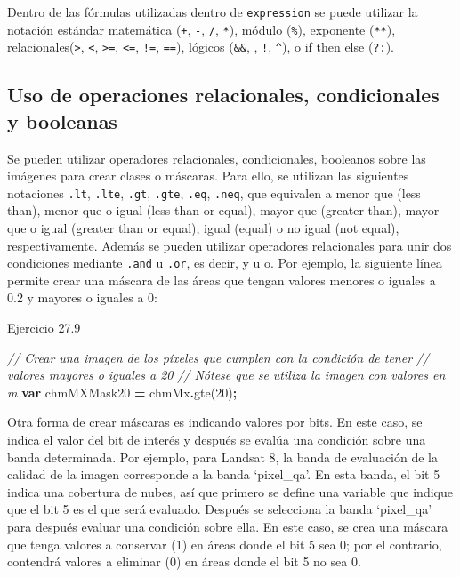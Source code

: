\documentclass[
  12pt,
  letterpaper,
  twoside]{book}
\newenvironment{Shaded}{\begin{snugshade}}{\end{snugshade}}
\newcommand{\CommentTok}[1]{\textcolor[rgb]{0.56,0.35,0.01}{\textit{#1}}}
\newcommand{\DecValTok}[1]{\textcolor[rgb]{0.00,0.00,0.81}{#1}}
\newcommand{\FunctionTok}[1]{\textcolor[rgb]{0.00,0.00,0.00}{#1}}
\newcommand{\KeywordTok}[1]{\textcolor[rgb]{0.13,0.29,0.53}{\textbf{#1}}}
\newcommand{\NormalTok}[1]{#1}
\newcommand{\OperatorTok}[1]{\textcolor[rgb]{0.81,0.36,0.00}{\textbf{#1}}}
\begin{document}
Dentro de las fórmulas utilizadas dentro de \texttt{expression} se puede utilizar la notación estándar matemática (\texttt{+}, \texttt{-}, \texttt{/}, \texttt{*}), módulo (\texttt{\%}), exponente (\texttt{**}), relacionales(\texttt{\textgreater{}}, \texttt{\textless{}}, \texttt{\textgreater{}=}, \texttt{\textless{}=}, \texttt{!=}, \texttt{==}), lógicos (\texttt{\&\&}, \texttt{\textbar{}\textbar{}}, \texttt{!}, \texttt{\^{}}), o if then else (\texttt{?:}).

\hypertarget{uso-de-operaciones-relacionales-condicionales-y-booleanas}{%
\subsection{Uso de operaciones relacionales, condicionales y booleanas}\label{uso-de-operaciones-relacionales-condicionales-y-booleanas}}

Se pueden utilizar operadores relacionales, condicionales, booleanos sobre las imágenes para crear clases o máscaras. Para ello, se utilizan las siguientes notaciones \texttt{.lt}, \texttt{.lte}, \texttt{.gt}, \texttt{.gte}, \texttt{.eq}, \texttt{.neq}, que equivalen a menor que (less than), menor que o igual (less than or equal), mayor que (greater than), mayor que o igual (greater than or equal), igual (equal) o no igual (not equal), respectivamente. Además se pueden utilizar operadores relacionales para unir dos condiciones mediante \texttt{.and} u \texttt{.or}, es decir, y u o. Por ejemplo, la siguiente línea permite crear una máscara de las áreas que tengan valores menores o iguales a 0.2 y mayores o iguales a 0:

Ejercicio 27.9

\begin{Shaded}
\begin{Highlighting}[]
\CommentTok{// Crear una imagen de los píxeles que cumplen con la condición de tener }
\CommentTok{// valores mayores o iguales a 20}
\CommentTok{// Nótese que se utiliza la imagen con valores en m}
\KeywordTok{var}\NormalTok{ chmMXMask20 }\OperatorTok{=}\NormalTok{ chmMx}\OperatorTok{.}\FunctionTok{gte}\NormalTok{(}\DecValTok{20}\NormalTok{)}\OperatorTok{;}
\end{Highlighting}
\end{Shaded}

Otra forma de crear máscaras es indicando valores por bits. En este caso, se indica el valor del bit de interés y después se evalúa una condición sobre una banda determinada. Por ejemplo, para Landsat 8, la banda de evaluación de la calidad de la imagen corresponde a la banda `pixel\_qa'. En esta banda, el bit 5 indica una cobertura de nubes, así que primero se define una variable que indique que el bit 5 es el que será evaluado. Después se selecciona la banda `pixel\_qa' para después evaluar una condición sobre ella. En este caso, se crea una máscara que tenga valores a conservar (1) en áreas donde el bit 5 sea 0; por el contrario, contendrá valores a eliminar (0) en áreas donde el bit 5 no sea 0.
\end{document}
